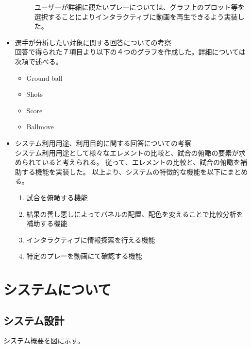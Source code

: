 \documentclass[sotsuron]{kuee}
\begin{document}
\begin{itemize}
\begin{description}
			ユーザーが詳細に観たいプレーについては、グラフ上のプロット等を選択することによりインタラクティブに動画を再生できるよう実装した。
		\end{description}
	\item 選手が分析したい対象に関する回答についての考察
		\\回答で得られた７項目より以下の４つのグラフを作成した。詳細については次項で述べる。
			\begin{itemize}
				\item Ground ball
				\item Shots
				\item Score
				\item Ballmove
			\end{itemize}
	\item システム利用用途、利用目的に関する回答についての考察
		\\システム利用用途として様々なエレメントの比較と、試合の俯瞰の要素が求められていると考えられる。
		従って、エレメントの比較と、試合の俯瞰を補助する機能を実装した。
		以上より、システムの特徴的な機能を以下にまとめる。
		\begin{enumerate}	
			\item 試合を俯瞰する機能
			\item 結果の善し悪しによってパネルの配置、配色を変えることで比較分析を補助する機能
			\item インタラクティブに情報探索を行える機能
			\item 特定のプレーを動画にて確認する機能
		\end{enumerate}
\end{itemize}

\chapter{システムについて}
\section{システム設計}
システム概要を図に示す。
\end{document}
